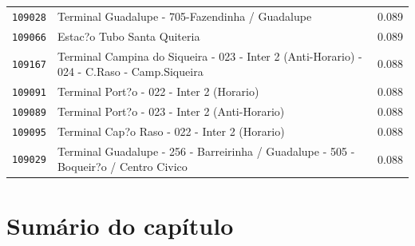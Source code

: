 \begin{table}[htb]
\begin{tabular}{p{1.0cm}p{9.0cm}p{3.0cm} }
           \texttt{109028} &                                             Terminal Guadalupe - 705-Fazendinha / Guadalupe  &  0.089 \\
           \texttt{109066} &                                                                 Estac?o Tubo Santa Quiteria  &  0.089 \\
           \texttt{109167} &  Terminal Campina do Siqueira - 023 - Inter 2 (Anti-Horario) - 024 - C.Raso - Camp.Siqueira  &  0.088 \\
           \texttt{109091} &                                                   Terminal Port?o - 022 - Inter 2 (Horario)  &  0.088 \\
           \texttt{109089} &                                              Terminal Port?o - 023 - Inter 2 (Anti-Horario)  &  0.088 \\
           \texttt{109095} &                                               Terminal Cap?o Raso - 022 - Inter 2 (Horario)  &  0.088 \\
           \texttt{109029} &        Terminal Guadalupe - 256 - Barreirinha / Guadalupe - 505 - Boqueir?o / Centro Civico  &  0.088 \\
                \hline  
    \end{tabular}
\end{table}


   

 

\section{Sumário do capítulo}




